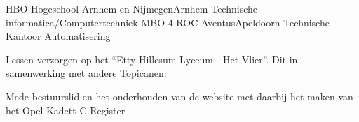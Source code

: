 \documentclass[
	a4paper
]{babelviscv}
\begin{document}
	\begin{cvtable}[\cvtablespace]
				{HBO Hogeschool Arnhem en Nijmegen}{Arnhem}
				{Technische informatica/Computertechniek}
				{MBO-4 ROC Aventus}{Apeldoorn}
				{Technische Kantoor Automatisering}
	\end{cvtable}

	\begin{cvtable}[\cvtablespace]
	\end{cvtable}

		\begin{cvtable}[\cvtablespace]
				{Lessen verzorgen op het “Etty Hillesum Lyceum - Het Vlier”. Dit in samenwerking met andere Topicanen.}
		\end{cvtable}

		\begin{cvtable}[\cvtablespace]
				{Mede bestuurslid en het onderhouden van de website met daarbij het maken van het Opel Kadett C Register}
		\end{cvtable}

\cvsignature
\end{document}
